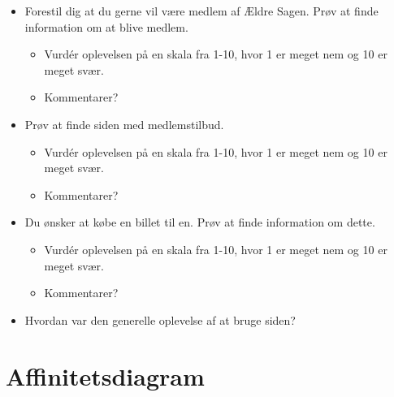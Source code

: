 \begin{appendices}
\begin{itemize}
\begin{itemize}
        \item Forestil dig at du gerne vil være medlem af Ældre Sagen. Prøv at finde information om at blive medlem.
        \begin{itemize}
            \item Vurdér oplevelsen på en skala fra 1-10, hvor 1 er meget nem og 10 er meget svær.
            \item Kommentarer?
        \end{itemize}
        \item Prøv at finde siden med medlemstilbud.
        \begin{itemize}
            \item Vurdér oplevelsen på en skala fra 1-10, hvor 1 er meget nem og 10 er meget svær.
            \item Kommentarer?
        \end{itemize}
        \item Du ønsker at købe en billet til en. Prøv at finde information om dette.
        \begin{itemize}
            \item Vurdér oplevelsen på en skala fra 1-10, hvor 1 er meget nem og 10 er meget svær.
            \item Kommentarer?
        \end{itemize}
        \item Hvordan var den generelle oplevelse af at bruge siden?
    \end{itemize}
\end{itemize}
    \section{Affinitetsdiagram}
    \label{b:aff}
    


\end{appendices}
